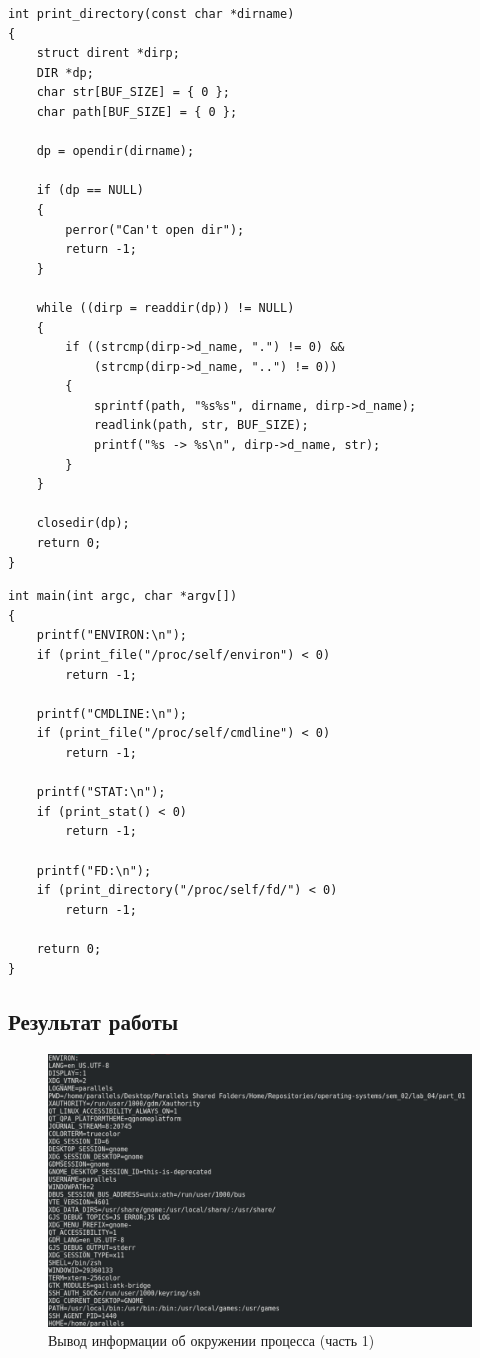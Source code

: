\begin{lstlisting}[caption=Вывод содержимого директории]
int print_directory(const char *dirname)
{
    struct dirent *dirp;
    DIR *dp;
    char str[BUF_SIZE] = { 0 };
    char path[BUF_SIZE] = { 0 };

    dp = opendir(dirname);

    if (dp == NULL)
    {
        perror("Can't open dir");
        return -1;
    }

    while ((dirp = readdir(dp)) != NULL)
    {
        if ((strcmp(dirp->d_name, ".") != 0) &&
            (strcmp(dirp->d_name, "..") != 0))
        {
            sprintf(path, "%s%s", dirname, dirp->d_name);
            readlink(path, str, BUF_SIZE);
            printf("%s -> %s\n", dirp->d_name, str);
        }
    }

    closedir(dp);
    return 0;
}
\end{lstlisting}

\begin{lstlisting}[caption=Функция {\ttfamily main}]
int main(int argc, char *argv[])
{
    printf("ENVIRON:\n");
    if (print_file("/proc/self/environ") < 0)
        return -1;

    printf("CMDLINE:\n");
    if (print_file("/proc/self/cmdline") < 0)
        return -1;

    printf("STAT:\n");
    if (print_stat() < 0)
        return -1;

    printf("FD:\n");
    if (print_directory("/proc/self/fd/") < 0)
        return -1;

    return 0;
}
\end{lstlisting}

\subsection{Результат работы}

\begin{figure}[H]
    \centering
    \includegraphics[scale=0.5]{img/part_01/env_01.png}
    \caption{Вывод информации об окружении процесса (часть 1)}
\end{figure}


